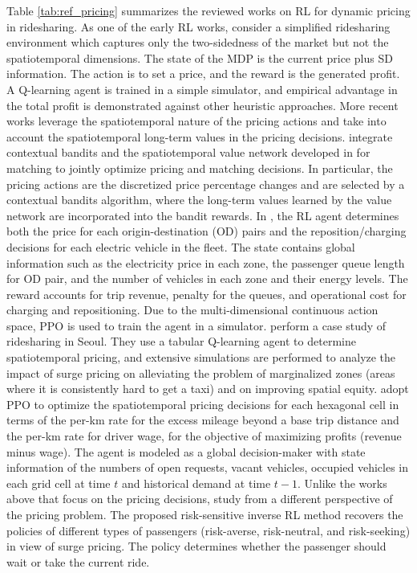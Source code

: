 \documentclass{article}
\begin{document}
Table \ref{tab:ref_pricing} summarizes the reviewed works on RL for dynamic pricing in ridesharing. 
As one of the early RL works, \cite{wu2016automated} consider a simplified ridesharing environment which captures only the two-sidedness of the market but not the spatiotemporal dimensions. The state of the MDP is the current price plus SD information. The action is to set a price, and the reward is the generated profit. A Q-learning agent is trained in a simple simulator, and empirical advantage in the total profit is demonstrated against other heuristic approaches.
More recent works leverage the spatiotemporal nature of the pricing actions and take into account the spatiotemporal long-term values in the pricing decisions.
\cite{chen2019inbede} integrate contextual bandits and the spatiotemporal value network developed in \citep{tang2019deep} for matching to jointly optimize pricing and matching decisions. In particular, the pricing actions are the discretized price percentage changes and are selected by a contextual bandits algorithm, where the long-term values learned by the value network are incorporated into the bandit rewards. In \citep{turan2020dynamic}, the RL agent determines both the price for each origin-destination (OD) pairs and the reposition/charging decisions for each electric vehicle in the fleet. The state contains global information such as the electricity price in each zone, the passenger queue length for OD pair, and the number of vehicles in each zone and their energy levels. The reward accounts for trip revenue, penalty for the queues, and operational cost for charging and repositioning. Due to the multi-dimensional continuous action space, PPO is used to train the agent in a simulator. \cite{song2020application} perform a case study of ridesharing in Seoul. They use a tabular Q-learning agent to determine spatiotemporal pricing, and extensive simulations are performed to analyze the impact of surge pricing on alleviating the problem of marginalized zones (areas where it is consistently hard to get a taxi) and on improving spatial equity.
\cite{chen2021spatial} adopt PPO to optimize the spatiotemporal pricing decisions for each hexagonal cell in terms of the per-km rate for the excess mileage beyond a base trip distance and the per-km rate for driver wage, for the objective of maximizing profits (revenue minus wage). The agent is modeled as a global decision-maker with state information of the numbers of open requests, vacant vehicles, occupied vehicles in each grid cell at time $t$ and historical demand at time $t-1$.
Unlike the works above that focus on the pricing decisions, \cite{mazumdar2017gradient} study from a different perspective of the pricing problem. The proposed risk-sensitive inverse RL method \citep{ng2000algorithms} recovers the policies of different types of passengers (risk-averse, risk-neutral, and risk-seeking) in view of surge pricing. The policy determines whether the passenger should wait or take the current ride.
\end{document}
